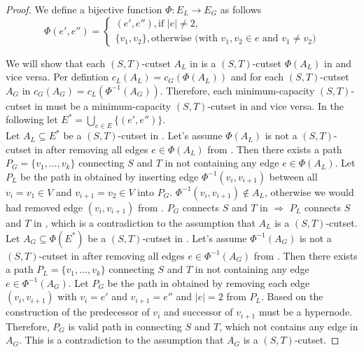 \begin{proof}

We define a bijective function $\Phi: E_L \rightarrow E_G$ as follows
\[ \Phi(e',e'') = 
   \begin{cases}
      (e',e''), \text{if } |e| \neq 2, \\
      \{v_1,v_2\}, \text{otherwise (with $v_1,v_2 \in e$ and $v_1 \neq v_2$)}
   \end{cases} \]

We will show that each $(S,T)$-cutset $A_L$ in  is a $(S,T)$-cutset $\Phi(A_L)$ in
 and vice versa. Per defintion $c_L(A_L) = c_G(\Phi(A_L))$ and for each $(S,T)$-cutset
$A_G$ in  $c_G(A_G) = c_L(\Phi^{-1}(A_G))$. Therefore, each minimum-capacity $(S,T)$-cutset
in  must be a minimum-capacity $(S,T)$-cutset in  and vice versa. In the following 
let $E^* = \bigcup_{e \in E} \{(e',e'')\}$. \\
Let $A_L \subseteq E^*$ be a $(S,T)$-cutset in . Let's assume $\Phi(A_L)$ is not a $(S,T)$-cutset
in  after removing all edges $e \in \Phi(A_L)$ from . Then there exists a path
$P_G = \{v_1,\ldots,v_k\}$ connecting $S$ and $T$ in  not containing any edge $e \in \Phi(A_L)$.
Let $P_L$ be the path in  obtained by inserting edge $\Phi^{-1}(v_i,v_{i+1})$ between all
$v_i = v_1 \in V$ and $v_{i+1} = v_2 \in V$ into $P_G$. $\Phi^{-1}(v_i,v_{i+1}) \notin A_L$, otherwise
we would had removed edge $(v_i,v_{i+1})$ from . $P_G$ connects $S$ and $T$ in  
$\Rightarrow$ $P_L$ connects $S$ and $T$ in , which is a contradiction to the assumption
that $A_L$ is a $(S,T)$-cutset. \\
Let $A_G \subseteq \Phi(E^*)$ be a $(S,T)$-cutset in . Let's assume $\Phi^{-1}(A_G)$ is not
a $(S,T)$-cutset in  after removing all edges $e \in \Phi^{-1}(A_G)$ from . Then
there exists a path $P_L = \{v_1,\ldots,v_k\}$ connecting $S$ and $T$ in  not containing any
edge $e \in \Phi^{-1}(A_G)$. Let $P_G$ be the path in  obtained by removing each edge
$(v_i,v_{i+1})$ with $v_i = e'$ and $v_{i+1} = e''$ and $|e| = 2$ from $P_L$. Based on the construction
of  the predecessor of $v_i$ and successor of $v_{i+1}$ must be a hypernode.
Therefore, $P_G$ is valid path in  connecting $S$ and $T$, which not contains any edge in 
$A_G$. This is a contradiction to the assumption that $A_G$ is a $(S,T)$-cutset.


\end{proof}
